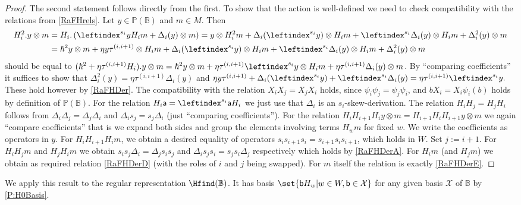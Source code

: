 \documentclass[a4paper,11pt]{amsart}
\numberwithin{equation}{subsection}
\theoremstyle{definition}
\theoremstyle{theorem}
\theoremstyle{remark}
\newcommand\Sym{W}
\newcommand\ba{\mathsf{a}}
\newcommand\bb{\mathsf{b}}
\newcommand\Po{\mathbb{P}(\mathbb{B})}
\newcommand{\Bo}{\mathbb{B}}
\begin{document}
\begin{proof} The second statement follows directly from the first. To show that the action is well-defined we need to check compatibility with the relations from  \autoref{RaFHrels}. Let $y\in\Po$ and $m\in M$. Then
\begin{align*}
H_i^2.y\otimes m&=H_i.\left(\leftindex^{s_i}yH_im+\Delta_i(y)\otimes m\right)=y\otimes H_i^2m+\Delta_i( \leftindex^{s_i}y)\otimes H_im +\leftindex^{s_i}\Delta_i(y)\otimes H_im+\Delta_i^2(y)\otimes m\\
&=\hbar^2y\otimes m+\eta y\tau^{(i,i+1)}\otimes H_im+\Delta_i( \leftindex^{s_i}y)\otimes H_im+\leftindex^{s_i}\Delta_i(y)\otimes H_im+\Delta_i^2(y)\otimes m
\end{align*}
should be equal to $(\hbar^2+\eta\tau^{(i,i+1)}H_i).y\otimes m=\hbar^2y\otimes m+\eta\tau^{(i,i+1)}\leftindex^{s_i}y\otimes H_im+\eta\tau^{(i,i+1)}\Delta_i(y)\otimes m$. By  ``comparing coefficients'' it suffices to show that
$\Delta_i^2(y)=\eta\tau^{(i,i+1)}\Delta_i(y)$ and
$\eta y\tau^{(i,i+1)}+\Delta_i(
\leftindex^{s_i}y)+\leftindex^{s_i}\Delta_i(y)=\eta\tau^{(i,i+1)}\leftindex^{s_i}y.$
These hold however by \autoref{RaFHDer}. The compatibility with the
relation $X_iX_j=X_jX_i$ holds, since $\psi_i\psi_j=\psi_j\psi_i$, and
$b X_i =X_i  \psi_i(b)$ holds by definition of $\Po$. For the relation
$H_i\ba=\leftindex^{s_i}\ba H_i$ we just use that $\Delta_i$ is an
$s_i$-skew-derivation. The relation $H_iH_j=H_jH_i$ follows from
$\Delta_i\Delta_j=\Delta_j\Delta_i$ and $\Delta_i s_j=s_j\Delta_i$ (just
``comparing coefficients''). For the relation $H_iH_{i+1}H_i y\otimes
m=H_{i+1}H_iH_{i+1} y\otimes m$ we again ``compare coefficients'' that
is we expand both sides and group the elements involving terms $H_wm$
for fixed $w$. We write the coefficients as operators in $y$.  For
$H_iH_{i+1}H_im$, we obtain a desired equality of operators
$s_is_{i+1}s_i=s_{i+1}s_is_{i+1}$, which holds in $\Sym$. Set $j:=i+1$. For $H_iH_{j}m$ and $H_jH_{i}m$ we obtain  $s_is_j\Delta_i=\Delta_js_is_j$ and  $\Delta_is_js_i=s_js_i\Delta_j$ respectively which holds by \autoref{RaFHDerA}. For $H_im$ (and $H_jm$) we obtain as
required relation \autoref{RaFHDerD} (with the roles of $i$ and $j$ being swapped). For $m$
itself the relation is exactly \autoref{RaFHDerE}.
\end{proof}

We apply this result to the regular representation $\Hfind(\Bo)$.  It has basis
$\set{\bb H_w|w\in\Sym,\bb\in \mathcal{X}}$ for any given basis
$\mathcal{X}$ of $\Bo$ by \autoref{P:H0Basis}.
\end{document}
